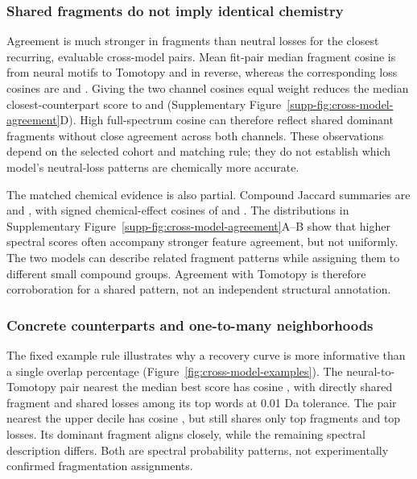 \documentclass[10pt,a4paper]{article}
\begin{document}
\subsubsection{Shared fragments do not imply identical chemistry}

Agreement is much stronger in fragments than neutral losses for the closest
recurring, evaluable cross-model pairs. Mean fit-pair median fragment cosine
is \OverlapNLFragment{} from neural motifs to Tomotopy and
\OverlapLNFragment{} in reverse, whereas the corresponding loss cosines are
\OverlapNLLoss{} and \OverlapLNLoss{}.
Giving the two channel cosines equal weight reduces the median
closest-counterpart score to \OverlapNLChannelCos{} and
\OverlapLNChannelCos{} (Supplementary Figure~\ref{supp-fig:cross-model-agreement}D).
High full-spectrum cosine can therefore reflect shared dominant fragments
without close agreement across both channels. These observations depend on
the selected cohort and matching rule; they do not establish which model's
neutral-loss patterns are chemically more accurate.

The matched chemical evidence is also partial. Compound Jaccard summaries
are \OverlapNLCompound{} and \OverlapLNCompound{}, with signed
chemical-effect cosines of \OverlapNLChemical{} and
\OverlapLNChemical{}. The distributions in
Supplementary Figure~\ref{supp-fig:cross-model-agreement}A--B show that higher spectral scores
often accompany stronger feature agreement, but not uniformly. The two
models can describe related fragment patterns while assigning them to
different small compound groups. Agreement with Tomotopy is therefore
corroboration for a shared pattern, not an independent structural annotation.



\subsubsection{Concrete counterparts and one-to-many neighborhoods}

The fixed example rule illustrates why a recovery curve is more informative
than a single overlap percentage (Figure~\ref{fig:cross-model-examples}).
The neural-to-Tomotopy pair nearest the median best score has cosine
\OverlapMedianCos{}, with \OverlapMedianFragmentShared{} directly shared fragment
and \OverlapMedianLossShared{} shared losses
among its top words at 0.01 Da tolerance. The pair nearest the upper decile
has cosine \OverlapUpperCos{}, but still shares only
\OverlapUpperFragmentShared{} top fragments and \OverlapUpperLossShared{}
top losses. Its dominant fragment aligns closely, while the remaining
spectral description differs. Both are spectral probability patterns, not
experimentally confirmed fragmentation assignments.
\end{document}
